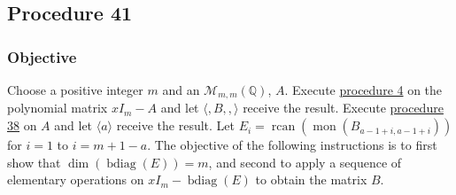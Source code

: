 \documentclass[twocolumn]{article}
\DeclareMathOperator{\bdiag}{bdiag}
\DeclareMathOperator{\rcan}{rcan}
\DeclareMathOperator{\mon}{mon}
\begin{document}
		\subsection{Procedure 41}\label{sec:procedure 41}
			\subsubsection{Objective}
				Choose a positive integer $m$ and an $\mathcal{M}_{m,m}(\mathbb{Q})$, $A$. Execute \hyperref[sec:procedure 4]{procedure 4} on the polynomial matrix $xI_m-A$ and let $\langle,B,,\rangle$ receive the result. Execute \hyperref[sec:procedure 38]{procedure 38} on $A$ and let $\langle a\rangle$ receive the result. Let $E_i=\rcan(\mon(B_{a-1+i,a-1+i}))$ for $i=1$ to $i=m+1-a$. The objective of the following instructions is to first show that $\dim(\bdiag(E))=m$, and second to apply a sequence of elementary operations on $xI_m-\bdiag(E)$ to obtain the matrix $B$.
\end{document}
